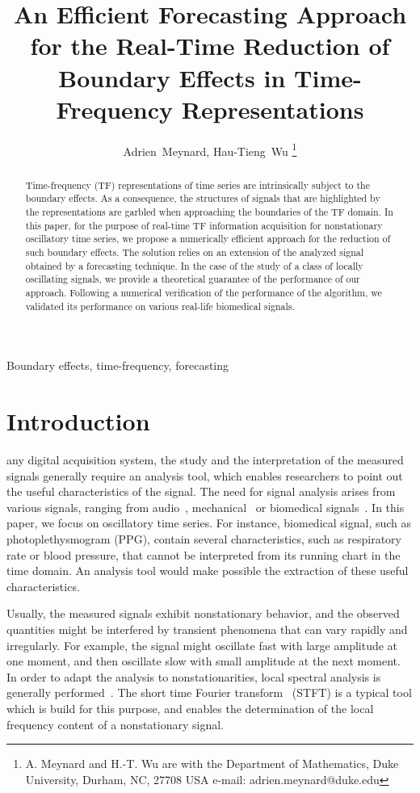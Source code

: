 \documentclass[journal]{IEEEtran}
\title{An Efficient Forecasting Approach for the Real-Time Reduction of Boundary Effects in Time-Frequency Representations}
\author{Adrien~Meynard, %
        Hau-Tieng~Wu
\thanks{A. Meynard and H.-T. Wu are with the Department
of Mathematics, Duke University, Durham,
NC, 27708 USA e-mail: adrien.meynard@duke.edu}}
\begin{document}
\maketitle

\begin{abstract}
Time-frequency (TF) representations of time series are intrinsically subject to the boundary effects. As a consequence, the structures of signals that are highlighted by the representations are garbled when approaching the boundaries of the TF domain. In this paper, for the purpose of real-time TF information acquisition for nonstationary oscillatory time series, we propose a numerically efficient approach for the reduction of such boundary effects. The solution relies on an extension of the analyzed signal obtained by a forecasting technique. In the case of the study of a class of locally oscillating signals, we provide a theoretical guarantee of the performance of our approach. Following a numerical verification of the performance of the algorithm, we validated its performance on various real-life biomedical signals.
\end{abstract}

\begin{IEEEkeywords}
Boundary effects, time-frequency, forecasting
\end{IEEEkeywords}

\section{Introduction}
\label{se:introduction}
 any digital acquisition system, the study and the interpretation of the measured signals generally require an analysis tool, which enables researchers to point out the useful characteristics of the signal. The need for signal analysis arises from various signals, ranging from audio~\cite{Stowell18computational,Muller11signal}, mechanical~\cite{Peng02vibration} or biomedical signals~\cite{Akay96detection}. In this paper, we focus on oscillatory time series. For instance, biomedical signal, such as photoplethysmogram (PPG), contain several characteristics, such as respiratory rate or blood pressure, that cannot be interpreted from its running chart in the time domain. An analysis tool would make possible the extraction of these useful characteristics. 

Usually, the measured signals exhibit nonstationary behavior, and the observed quantities might be interfered by transient phenomena that can vary rapidly and irregularly. For example, the signal might oscillate fast with large amplitude at one moment, and then oscillate slow with small amplitude at the next moment. In order to adapt the analysis to nonstationarities, local spectral analysis is generally performed~\cite{Stoica05spectral,Matz97generalized}. The short time Fourier transform~\cite{Grochenig01foundations} (STFT) is a typical tool which is build for this purpose, and enables the determination of the local frequency content of a nonstationary signal.
\end{document}
